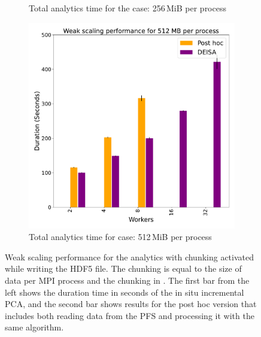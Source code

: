 \begin{figure}
\begin{subfigure}[b]{0.3\textwidth}
         \caption{Total analytics time for the case: 256\,MiB per process}
         \label{fig:A256CH}
     \end{subfigure}
     \hfill
     \begin{subfigure}[b]{0.3\textwidth}
         \centering
         \includegraphics[width=\textwidth, height=\textwidth]{figures/512A_CH.pdf}
         \caption{Total analytics time for case: 512\,MiB per process}
         \label{fig:A512CH}
     \end{subfigure}
        \caption{Weak scaling performance for the analytics with chunking activated while writing the HDF5 file. The chunking is equal to the size of data per MPI process and the chunking in \dask. The first bar from the left shows the duration time in seconds of the in situ incremental PCA, and the second bar shows results for the post hoc version that includes both reading data from the PFS and processing it with the same algorithm.}
        \label{fig:perfA2}
\end{figure}

